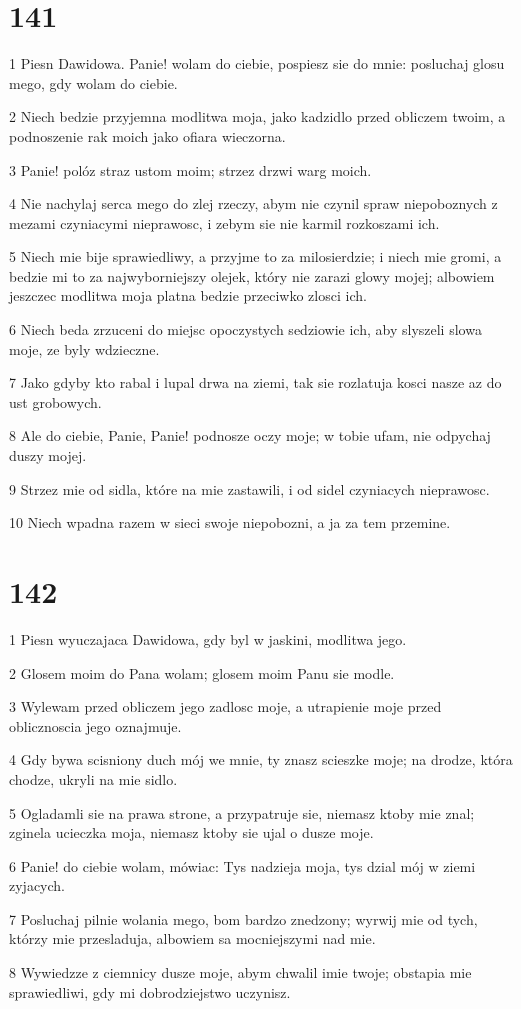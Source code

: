 \chapter{141}

\par 1 Piesn Dawidowa. Panie! wolam do ciebie, pospiesz sie do mnie: posluchaj glosu mego, gdy wolam do ciebie.
\par 2 Niech bedzie przyjemna modlitwa moja, jako kadzidlo przed obliczem twoim, a podnoszenie rak moich jako ofiara wieczorna.
\par 3 Panie! polóz straz ustom moim; strzez drzwi warg moich.
\par 4 Nie nachylaj serca mego do zlej rzeczy, abym nie czynil spraw niepoboznych z mezami czyniacymi nieprawosc, i zebym sie nie karmil rozkoszami ich.
\par 5 Niech mie bije sprawiedliwy, a przyjme to za milosierdzie; i niech mie gromi, a bedzie mi to za najwyborniejszy olejek, który nie zarazi glowy mojej; albowiem jeszczec modlitwa moja platna bedzie przeciwko zlosci ich.
\par 6 Niech beda zrzuceni do miejsc opoczystych sedziowie ich, aby slyszeli slowa moje, ze byly wdzieczne.
\par 7 Jako gdyby kto rabal i lupal drwa na ziemi, tak sie rozlatuja kosci nasze az do ust grobowych.
\par 8 Ale do ciebie, Panie, Panie! podnosze oczy moje; w tobie ufam, nie odpychaj duszy mojej.
\par 9 Strzez mie od sidla, które na mie zastawili, i od sidel czyniacych nieprawosc.
\par 10 Niech wpadna razem w sieci swoje niepobozni, a ja za tem przemine.

\chapter{142}

\par 1 Piesn wyuczajaca Dawidowa, gdy byl w jaskini, modlitwa jego.
\par 2 Glosem moim do Pana wolam; glosem moim Panu sie modle.
\par 3 Wylewam przed obliczem jego zadlosc moje, a utrapienie moje przed oblicznoscia jego oznajmuje.
\par 4 Gdy bywa scisniony duch mój we mnie, ty znasz scieszke moje; na drodze, która chodze, ukryli na mie sidlo.
\par 5 Ogladamli sie na prawa strone, a przypatruje sie, niemasz ktoby mie znal; zginela ucieczka moja, niemasz ktoby sie ujal o dusze moje.
\par 6 Panie! do ciebie wolam, mówiac: Tys nadzieja moja, tys dzial mój w ziemi zyjacych.
\par 7 Posluchaj pilnie wolania mego, bom bardzo znedzony; wyrwij mie od tych, którzy mie przesladuja, albowiem sa mocniejszymi nad mie.
\par 8 Wywiedzze z ciemnicy dusze moje, abym chwalil imie twoje; obstapia mie sprawiedliwi, gdy mi dobrodziejstwo uczynisz.


